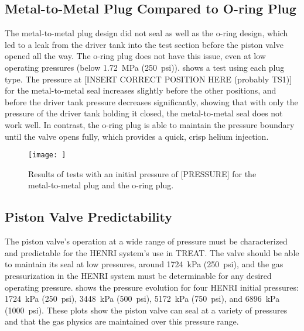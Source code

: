 
\subsection{Metal-to-Metal Plug Compared to O-ring Plug}
The metal-to-metal plug design did not seal as well as the o-ring design, which led to a leak from the driver tank into the test section before the piston valve opened all the way. The o-ring plug does not have this issue, even at low operating pressures (below \SI{1.72}{\mega\pascal} (\SI{250}{psi})).  shows a test using each plug type. The pressure at [INSERT CORRECT POSITION HERE (probably TS1)] for the metal-to-metal seal increases slightly before the other positions, and before the driver tank pressure decreases significantly, showing that with only the pressure of the driver tank holding it closed, the metal-to-metal seal does not work well. In contrast, the o-ring plug is able to maintain the pressure boundary until the valve opens fully, which provides a quick, crisp helium injection.

\begin{figure}
    \vspace{16pt}
    \centering
    \texttt{[image: ]}
    \caption{Results of tests with an initial pressure of [PRESSURE] for the metal-to-metal plug and the o-ring plug.}
    \label{fig:metal vs oring}
    \vspace{16pt}
\end{figure}

\subsection{Piston Valve Predictability}
The piston valve's operation at a wide range of pressure must be characterized and predictable for the HENRI system's use in TREAT. The valve should be able to maintain its seal at low pressures, around \SI{1724}{\kilo\pascal} (\SI{250}{psi}), and the gas pressurization in the HENRI system must be determinable for any desired operating pressure.  shows the pressure evolution for four HENRI initial pressures: \SI{1724}{\kilo\pascal} (\SI{250}{psi}), \SI{3448}{\kilo\pascal} (\SI{500}{psi}), \SI{5172}{\kilo\pascal} (\SI{750}{psi}), and \SI{6896}{\kilo\pascal} (\SI{1000}{psi}). These plots show the piston valve can seal at a variety of pressures and that the gas physics are maintained over this pressure range.

